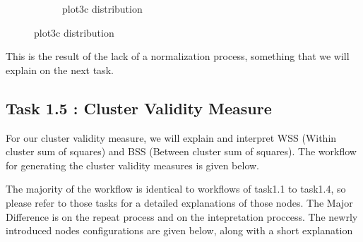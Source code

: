 \documentclass[11pt]{article}
\begin{document}
\begin{figure}[H]
\begin{subfigure}{0.4\textwidth}
					\caption{plot3c distribution}
					\label{fig:third}
				\end{subfigure}	
				\label{fig:figures}
			\end{figure}
			\fi
			 This is the result of the lack of a normalization process, something that we will explain on the next task.
		\subsection*{Task 1.5 : Cluster Validity Measure}
			For our cluster validity measure, we will explain and interpret WSS (Within cluster sum of squares) and BSS (Between cluster sum of squares). The workflow for generating the cluster validity measures is given below.

			The majority of the workflow is identical to workflows of task1.1 to task1.4, so please refer to those tasks for a detailed explanations of those nodes. The Major Difference is on the repeat process and on the intepretation proccess. The newrly introduced nodes configurations are given below, along with a short explanation
			\iffalse
\end{document}

